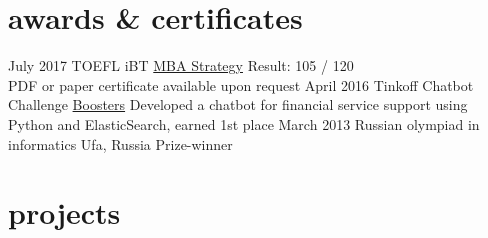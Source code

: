 \documentclass[]{friggeri-cv}
\begin{document}
\section{awards \& certificates}

\begin{entrylist}
	\entry
	{July 2017}
	{TOEFL iBT}
	{\href{http://www.mbastrategy.ru/}{MBA Strategy}}
	{Result: 105 / 120 \\
		PDF or paper certificate available upon request}
	\entry
	{April 2016}
	{Tinkoff Chatbot Challenge}
	{\href{https://boosters.pro/}{Boosters}}
	{Developed a chatbot for financial service support using Python and ElasticSearch, earned 1st place}
	\entry
	{March 2013}
	{Russian olympiad in informatics}
	{Ufa, Russia}
	{Prize-winner}
\end{entrylist}

\section{projects}
\end{document}
